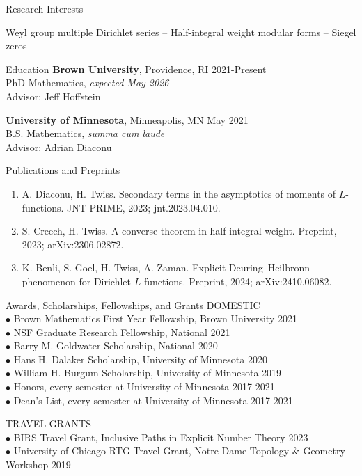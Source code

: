 \documentclass{resume} %
\begin{document}
\begin{rSection}{Research Interests}
    \begin{center}Weyl group multiple Dirichlet series -- Half-integral weight modular forms -- Siegel zeros\end{center}
\end{rSection}

\begin{rSection}{Education}
    {\bf Brown University}, Providence, RI \hfill {2021-Present} \\
    PhD Mathematics, \textit{expected May 2026} \\
    \hphantom{\quad}Advisor: Jeff Hoffstein

    {\bf University of Minnesota}, Minneapolis, MN \hfill {May 2021} \\
    B.S. Mathematics, \textit{summa cum laude} \\
    \hphantom{\quad}Advisor: Adrian Diaconu
\end{rSection}

\begin{rSection}{Publications and Preprints}
    \begin{enumerate}
        \item {A. Diaconu, H. Twiss. Secondary terms in the asymptotics of moments of $L$-functions. JNT PRIME, 2023; jnt.2023.04.010.}
        \item {S. Creech, H. Twiss. A converse theorem in half-integral weight. Preprint, 2023; arXiv:2306.02872.}
        \item {K. Benli, S. Goel, H. Twiss, A. Zaman. Explicit Deuring–Heilbronn phenomenon for Dirichlet $L$-functions. Preprint, 2024; arXiv:2410.06082.}
    \end{enumerate}
\end{rSection}

\begin{rSection}{Awards, Scholarships, Fellowships, and Grants}
    DOMESTIC \\
    {$\bullet$ Brown Mathematics First Year Fellowship, Brown University} \hfill {2021} \\
    {$\bullet$ NSF Graduate Research Fellowship, National} \hfill {2021} \\
    {$\bullet$ Barry M. Goldwater Scholarship, National} \hfill {2020} \\
    {$\bullet$ Hans H. Dalaker Scholarship, University of Minnesota} \hfill {2020} \\
    {$\bullet$ William H. Burgum Scholarship, University of Minnesota} \hfill {2019} \\
    {$\bullet$ Honors, every semester at University of Minnesota} \hfill {2017-2021} \\
    {$\bullet$ Dean's List, every semester at University of Minnesota} \hfill {2017-2021}

    TRAVEL GRANTS \\
    {$\bullet$ BIRS Travel Grant, Inclusive Paths in Explicit Number Theory} \hfill {2023} \\
    {$\bullet$ University of Chicago RTG Travel Grant, Notre Dame Topology \& Geometry Workshop} \hfill {2019} 
\end{rSection}
\end{document}
